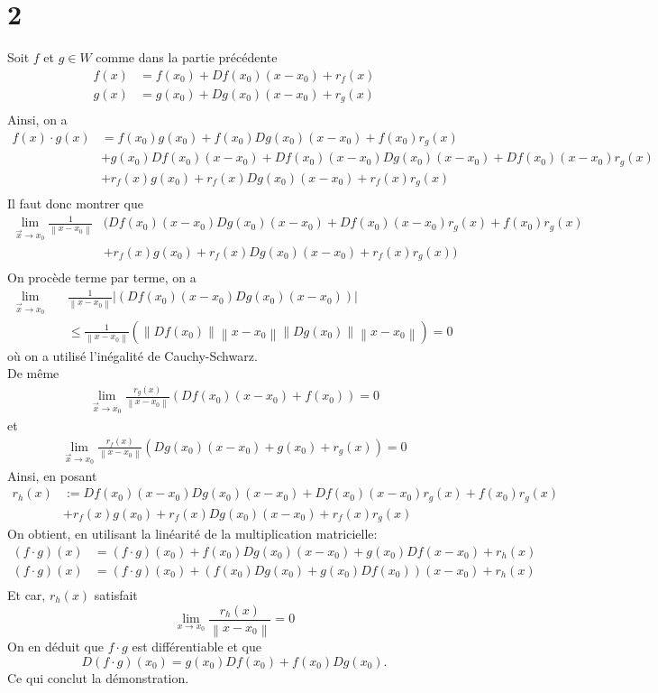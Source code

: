 \documentclass[11pt, a4paper]{article}
\newcommand\N[1]{\left\lVert#1\right\rVert}
\begin{document}
\section*{2}
Soit $f$ et $g \in W$ comme dans la partie précédente
\begin{align*}
	f( x) &= f( x_0)  + Df( x_0)  ( x-x_0)  + r_f( x) \\
	g( x) &= g( x_0)  + Dg( x_0)  ( x-x_0)  + r_g( x) \\
\end{align*}
Ainsi, on a
\begin{align*}
	f( x) \cdot g( x) &=  f( x_0) g( x_0) + f( x_0) Dg( x_0)( x-x_0)  + f( x_0) r_g( x)\\
				  &+ g( x_0) Df( x_0)( x-x_0) + Df( x_0)( x-x_0)  Dg( x_0) ( x-x_0)+ Df(x_0 )  ( x-x_0) r_g( x)  \\
				  &+ r_f( x) g( x_0) + r_f( x) Dg( x_0) ( x-x_0) + r_f( x) r_g( x) \\
\end{align*}
Il faut donc montrer que
\begin{align*}
	\lim_{\vec{x} \to x_0} \frac{1}{\N { x-x_0} } &\big( Df( x_0)( x-x_0)  Dg( x_0) ( x-x_0)+ Df(x_0 )  ( x-x_0) r_g( x) + f( x_0) r_g( x) \\
&+ r_f( x) g( x_0) + r_f( x) Dg( x_0) ( x-x_0) + r_f( x) r_g( x)\big)\\
\end{align*}
On procède terme par terme, on a
\begin{align*}
\lim_{\vec{x} \to x_0}\quad &\frac{1}{\N { x-x_0} } \vert( Df( x_0)( x-x_0)  Dg( x_0) ( x-x_0) )\vert\\
&\leq \frac{1}{\N { x-x_0} } ( \N { Df( x_0) } \N { x-x_0} \N { Dg( x_0) } \N { x-x_0}  ) =0
\end{align*}
où on a utilisé l'inégalité de Cauchy-Schwarz.\\
De même
\begin{align*}
	\lim_{\vec{x} \to x_0} \frac{r_g( x) }{\N { x-x_0} } ( Df( x_0) ( x-x_0)  + f( x_0)  )  = 0
\end{align*}
et
\begin{align*}
	\lim_{\vec{x} \to x_0} \frac{r_f( x) }{\N { x-x_0} } ( Dg( x_0) ( x-x_0)  + g( x_0) + r_g( x)   )  = 0
\end{align*}
Ainsi, en posant
\begin{align*}
	r_h ( x)  &:= Df( x_0)( x-x_0)  Dg( x_0) ( x-x_0)+ Df(x_0 )  ( x-x_0) r_g( x) + f( x_0) r_g( x) \\
&+ r_f( x) g( x_0) + r_f( x) Dg( x_0) ( x-x_0) + r_f( x) r_g( x)
\end{align*}
On obtient, en utilisant la linéarité de la multiplication matricielle:
\begin{align*}
	( f\cdot g) ( x) &= ( f\cdot g) ( x_0) + f( x_0) Dg( x_0) ( x-x_0)  + g( x_0) Df( x-x_0)  + r_h( x) \\
	( f\cdot g) ( x) &= ( f\cdot g) ( x_0) +\left( f( x_0) Dg( x_0) + g( x_0) Df( x_0) \right) ( x-x_0)  + r_h( x) \\
\end{align*}
Et car, $r_h( x) $ satisfait
\[ 
	\lim_{x \to x_0} \frac{r_h( x) }{\N { x-x_0} } =0
\]
On en déduit que $f \cdot g$ est différentiable et que
\[ 
	D( f\cdot g)( x_0)  =  g(x_0 ) Df( x_0)   + f( x_0)  Dg( x_0) .
\]
Ce qui conclut la démonstration.
\end{document}
